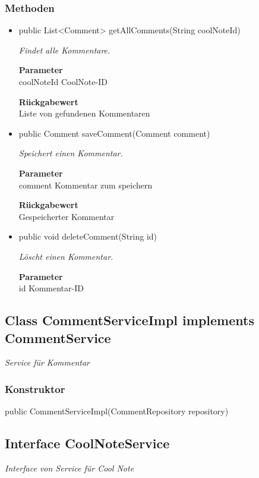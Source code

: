 \documentclass[a4paper]{scrreprt}
\begin{document}
    \subsubsection{Methoden}
    \begin{itemize}
    	\item{public List<Comment> getAllComments(String coolNoteId)}
    	
    	\textit{Findet alle Kommentare.}
    	
    	\textbf{Parameter} \\
    	coolNoteId CoolNote-ID
    	
    	\textbf{Rückgabewert} \\
    	Liste von gefundenen Kommentaren        \item{public Comment saveComment(Comment comment)}
    	
    	\textit{Speichert einen Kommentar.}
    	
    	\textbf{Parameter} \\
    	comment Kommentar zum speichern
    	
    	\textbf{Rückgabewert} \\
    	Gespeicherter Kommentar        \item{public void deleteComment(String id)}
    	
    	\textit{Löscht einen Kommentar.}
    	
    	\textbf{Parameter} \\
    	id Kommentar-ID
    	
    	
    \end{itemize}
    \subsection{Class CommentServiceImpl implements CommentService}
    \textit{Service für Kommentar}
    \subsubsection{Konstruktor}
    public CommentServiceImpl(CommentRepository repository)
    \subsection{Interface CoolNoteService}
    \textit{Interface von Service für Cool Note}
\end{document}
